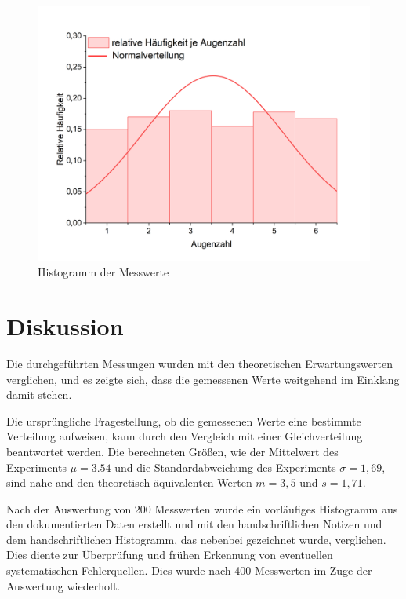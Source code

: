 \documentclass[a4paper,12pt]{article}
\begin{document}
\begin{figure}[H]
    \label{Abb2}
    \centering
    \includegraphics[width=\textwidth]{bilder/Histogramm.png}
    \caption{Histogramm der Messwerte}
\end{figure}

\section{Diskussion}

Die durchgeführten Messungen wurden mit den theoretischen Erwartungswerten verglichen, und es zeigte sich, 
dass die gemessenen Werte weitgehend im Einklang damit stehen.

Die ursprüngliche Fragestellung, ob die gemessenen Werte eine bestimmte Verteilung aufweisen, kann 
durch den Vergleich mit einer Gleichverteilung beantwortet werden.
Die berechneten Größen, wie der Mittelwert des Experiments $\mu=3.54$ und die 
Standardabweichung des Experiments $\sigma = 1,69$, sind nahe and den theoretisch äquivalenten Werten $m=3,5$ 
und $s=1,71$.

Nach der Auswertung von 200 Messwerten wurde ein vorläufiges Histogramm aus den dokumentierten Daten 
erstellt und mit den handschriftlichen Notizen und dem handschriftlichen Histogramm, das nebenbei 
gezeichnet wurde, verglichen. Dies diente zur Überprüfung und frühen Erkennung von eventuellen 
systematischen Fehlerquellen. Dies wurde nach 400 Messwerten im Zuge der Auswertung wiederholt.
\end{document}
